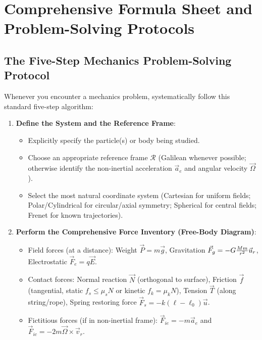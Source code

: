 \chapter{Comprehensive Formula Sheet and Problem-Solving Protocols}
\label{app:formula_sheet}

\section{The Five-Step Mechanics Problem-Solving Protocol}

Whenever you encounter a mechanics problem, systematically follow this standard five-step algorithm:

\begin{enumerate}[leftmargin=1.8em,itemsep=4pt]
  \item \textbf{Define the System and the Reference Frame}:
        \begin{itemize}[leftmargin=1.4em,itemsep=2pt]
          \item Explicitly specify the particle(s) or body being studied.
          \item Choose an appropriate reference frame $\mathcal{R}$ (Galilean whenever possible; otherwise identify the non-inertial acceleration $\vec{a}_e$ and angular velocity $\vec{\Omega}$).
          \item Select the most natural coordinate system (Cartesian for uniform fields; Polar/Cylindrical for circular/axial symmetry; Spherical for central fields; Frenet for known trajectories).
        \end{itemize}
  \item \textbf{Perform the Comprehensive Force Inventory (Free-Body Diagram)}:
        \begin{itemize}[leftmargin=1.4em,itemsep=2pt]
          \item Field forces (at a distance): Weight $\vec{P} = m\vec{g}$, Gravitation $\vec{F}_g = -G\frac{Mm}{r^2}\vec{u}_r$, Electrostatic $\vec{F}_e = q\vec{E}$.
          \item Contact forces: Normal reaction $\vec{N}$ (orthogonal to surface), Friction $\vec{f}$ (tangential, static $f_s \le \mu_s N$ or kinetic $f_k = \mu_k N$), Tension $\vec{T}$ (along string/rope), Spring restoring force $\vec{F}_s = -k(\ell - \ell_0)\vec{u}$.
          \item Fictitious forces (if in non-inertial frame): $\vec{F}_{ie} = -m\vec{a}_e$ and $\vec{F}_{ic} = -2m\vec{\Omega}\times\vec{v}_r$.
        \end{itemize}

\end{enumerate}
